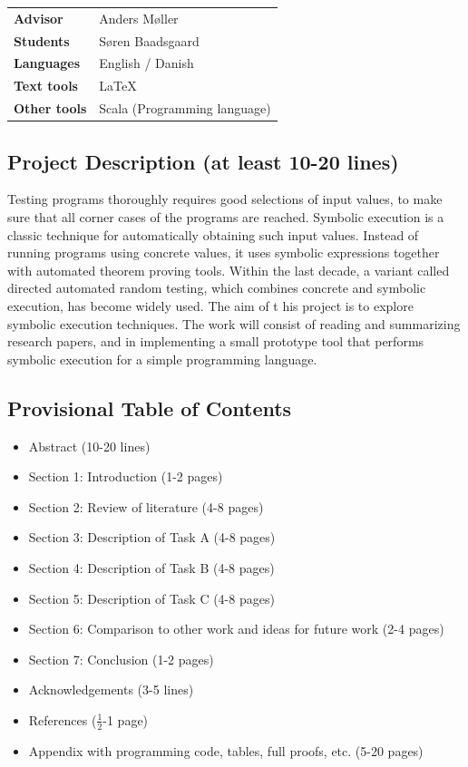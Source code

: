 \documentclass{article}
\begin{document}
\pagestyle{fancy}

\bgroup{}
\begin{table}[h]
\begin{tabular}{ll}
\textbf{Advisor}     & Anders Møller    \\
\textbf{Students}    & Søren Baadsgaard \\
\textbf{Languages}   & English / Danish \\
\textbf{Text tools}  & \LaTeX         \\
\textbf{Other tools} & Scala (Programming language)         
\end{tabular}
\end{table}
\egroup\vspace{-0.cm}

\subsection*{Project Description (at least 10-20 lines)}
Testing programs thoroughly requires good selections of input values, to make sure that all corner 
cases of the programs are reached. Symbolic execution is a classic technique for automatically 
obtaining such input values. Instead of running programs using
concrete values, it uses symbolic 
expressions together with automated theorem proving tools. Within the last decade, a variant 
called directed automated random testing, which combines concrete and symbolic execution, has 
become widely used.
The aim of t
his project is to explore symbolic execution techniques. The work will consist of 
reading and summarizing research papers, and in implementing a small prototype tool that 
performs symbolic execution for a simple programming language.

\subsection*{Provisional Table of Contents}
\begin{itemize}
    \item Abstract (10-20 lines)
    \item Section 1: Introduction (1-2 pages)
    \item Section 2: Review of literature (4-8 pages)
    \item Section 3: Description of Task A (4-8 pages)
    \item Section 4: Description of Task B (4-8 pages)
    \item Section 5: Description of Task C (4-8 pages)
    \item Section 6: Comparison to other work and ideas for future work (2-4 pages)
    \item Section 7: Conclusion (1-2 pages)
    \item Acknowledgements (3-5 lines)
    \item References ($\frac{1}{2}$-1 page)
    \item Appendix with programming code, tables, full proofs, etc. (5-20 pages)
\end{itemize}
\end{document}
